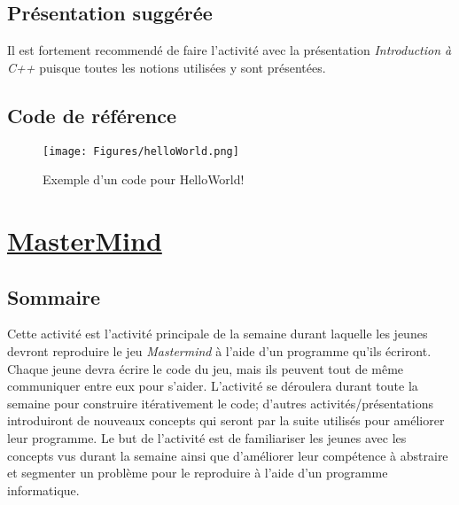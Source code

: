 \documentclass[]{report}
\begin{document}
\begin{adjustwidth}{1.5cm}{0cm}
\subsection*{\Large{Présentation suggérée}}
\vspace{-5mm}\makebox[0.917\textwidth]{\hrulefill}\vspace{3mm}

Il est fortement recommendé de faire l'activité avec la présentation \textit{Introduction à C++} puisque toutes les notions utilisées y sont présentées.

\newpage
\subsection*{\Large{Code de référence}}
\vspace{-5mm}\makebox[0.917\textwidth]{\hrulefill}\vspace{3mm}
\begin{figure}[h]
	\centering
	\texttt{[image: Figures/helloWorld.png]}
	\caption{Exemple d'un code pour HelloWorld!}
	\label{hw:fig:code}
\end{figure}
\newpage
\section*{\centering\underline{MasterMind}}

\subsection*{\Large{Sommaire}}
\vspace{-5mm}\makebox[0.917\textwidth]{\hrulefill}\vspace{3mm}

Cette activité est l'activité principale de la semaine durant laquelle les jeunes devront reproduire le jeu \textit{Mastermind} à l'aide d'un programme qu'ils écriront.  Chaque jeune devra écrire le code du jeu, mais ils peuvent tout de même communiquer entre eux pour s'aider. L'activité se déroulera durant toute la semaine pour construire itérativement le code; d'autres activités/présentations introduiront de nouveaux concepts qui seront par la suite utilisés pour améliorer leur programme. Le but de l'activité est de familiariser les jeunes avec les concepts vus durant la semaine ainsi que d'améliorer leur compétence à abstraire et segmenter un problème pour le reproduire à l'aide d'un programme informatique.


\end{adjustwidth}
\end{document}
